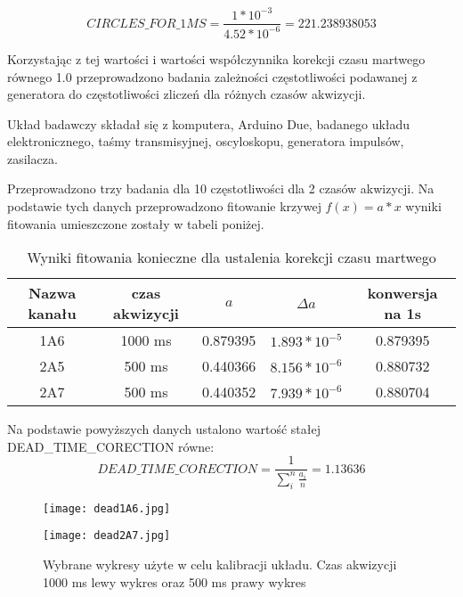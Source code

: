 \begin{equation}
        \label{per cykl}
        CIRCLES\_FOR\_1MS = \frac{1*10^{-3}}{4.52 * 10^{-6}} = 221.238938053
\end{equation}

Korzystając z tej wartości i wartości współczynnika korekcji czasu martwego równego 1.0 przeprowadzono badania zależności częstotliwości podawanej z generatora do częstotliwości zliczeń dla różnych czasów akwizycji.  

Układ badawczy składał się z komputera, Arduino Due, badanego układu elektronicznego, taśmy transmisyjnej, oscyloskopu, generatora impulsów, zasilacza. 

Przeprowadzono trzy badania dla 10 częstotliwości dla 2 czasów akwizycji. Na podstawie tych danych przeprowadzono fitowanie krzywej $f(x) = a*x$ wyniki fitowania umieszczone zostały w tabeli poniżej.

\begin{table}
        \caption{Wyniki fitowania konieczne dla ustalenia korekcji czasu martwego}
        \label{dead time fit}
        \centering
        \begin{tabular}{|c|c|c|c|c|}
                \hline
                Nazwa kanału & czas akwizycji & $a$ & $\Delta a$ & konwersja na 1s \\ \hline
                1A6 & 1000 ms & 0.879395 & $1.893 * 10^{-5}$ & 0.879395 \\ \hline
                2A5 & 500 ms & 0.440366 & $8.156 * 10^{-6}$ & 0.880732 \\ \hline
                2A7 & 500 ms & 0.440352 & $7.939 * 10^{-6}$ & 0.880704 \\ \hline
        \end{tabular}
\end{table}

Na podstawie powyższych danych ustalono wartość stałej DEAD\_TIME\_CORECTION równe:
\begin{equation}
        \label{dead time eq}
        DEAD\_TIME\_CORECTION = \frac{1}{\sum^n_i \frac{a_i}{n}} = 1.13636
\end{equation} 

\begin{figure}
        \centering
        \begin{multicols}{2}
                \texttt{[image: dead1A6.jpg]} \par
                \texttt{[image: dead2A7.jpg]} \par
        \end{multicols}
        \caption{Wybrane wykresy użyte w celu kalibracji układu. Czas akwizycji 1000 ms lewy wykres oraz 500 ms prawy wykres}
        \label{wykresy fit calib}
\end{figure}

